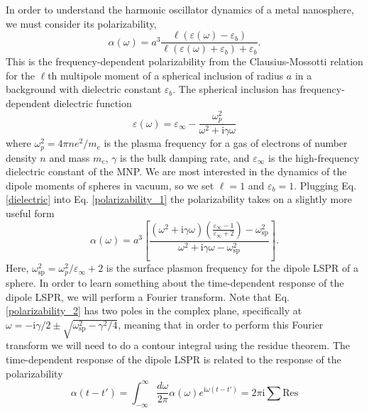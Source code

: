 \documentclass [11pt, proquest] {uwthesis}[2016/11/22]
\begin{document}
In order to understand the harmonic oscillator dynamics of a metal nanosphere, we must consider its polarizability,
\begin{equation}
\alpha(\omega) = a^3\frac{\ell(\varepsilon(\omega)-\varepsilon_b)}{\ell(\varepsilon(\omega)+\varepsilon_b)+\varepsilon_b}.
\label{polarizability_1}
\end{equation}
This is the frequency-dependent polarizability from the Clausius-Mossotti relation for the $\ell$th multipole moment of a spherical inclusion of radius $a$ in a background with dielectric constant $\varepsilon_b$.  The spherical inclusion has frequency-dependent dielectric function 
\begin{equation}
\varepsilon(\omega) = \varepsilon_{\infty} - \frac{\omega_p^2}{\omega^2+\textrm{i}\gamma\omega}
\label{dielectric}
\end{equation}
where $\omega_p^2 = 4\pi ne^2/m_e$ is the plasma frequency for a gas of electrons of number density $n$ and mass $m_e$, $\gamma$ is the bulk damping rate, and $\varepsilon_{\infty}$ is the high-frequency dielectric constant of the MNP. We are most interested in the dynamics of the dipole moments of spheres in vacuum, so we set $\ell = 1$ and $\varepsilon_b = 1$. Plugging Eq. \ref{dielectric} into Eq. \ref{polarizability_1} the polarizability takes on a slightly more useful form
\begin{equation}
\alpha(\omega) = a^3\left[\frac{\left(\omega^2+\textrm{i}\gamma\omega\right)\left(\frac{\varepsilon_{\infty}-1}{\varepsilon_{\infty}+2}\right)-\omega_{\textrm{sp}}^2}{\omega^2+\textrm{i}\gamma\omega-\omega_{\textrm{sp}}^2}\right].
\label{polarizability_2}
\end{equation}
Here, $\omega_{\textrm{sp}}^2 = \omega_p^2/\varepsilon_{\infty}+2$ is the surface plasmon frequency for the dipole LSPR of a sphere. In order to learn something about the time-dependent response of the dipole LSPR, we will perform a Fourier transform. Note that Eq. \ref{polarizability_2} has two poles in the complex plane, specifically at $\omega = -\textrm{i}\gamma/2 \pm \sqrt{\omega_\textrm{sp}^2-\gamma^2/4}$, meaning that in order to perform this Fourier transform we will need to do a contour integral using the residue theorem. The time-dependent response of the dipole LSPR is related to the response of the polarizability
\begin{equation}
\alpha(t-t') = \int_{-\infty}^{\infty}\frac{d\omega}{2\pi}\alpha(\omega)e^{\textrm{i}\omega (t-t')} = 2\pi\textrm{i}\sum\textrm{Res}
\label{res_theorem}
\end{equation}
\end{document}
